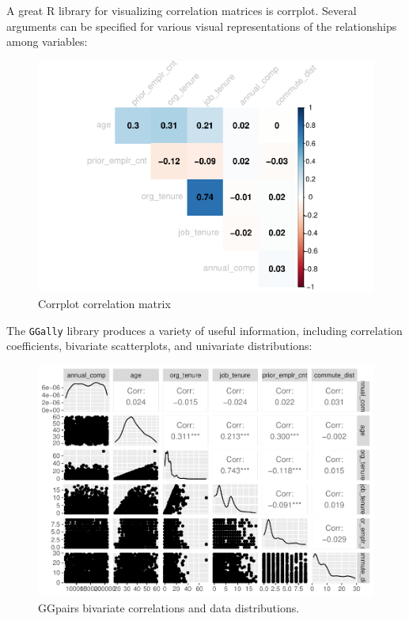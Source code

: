 \documentclass[
]{book}
\begin{document}
A great R library for visualizing correlation matrices is corrplot. Several arguments can be specified for various visual representations of the relationships among variables:

\begin{figure}

{\centering \includegraphics[width=1\linewidth]{The_Fundamentals_of_People_Analytics_files/figure-latex/corrplot-comp-1} 

}

\caption{Corrplot correlation matrix}\label{fig:corrplot-comp}
\end{figure}

The \texttt{GGally} library produces a variety of useful information, including correlation coefficients, bivariate scatterplots, and univariate distributions:

\begin{figure}

{\centering \includegraphics[width=1\linewidth]{The_Fundamentals_of_People_Analytics_files/figure-latex/ggpairs-comp-1} 

}

\caption{GGpairs bivariate correlations and data distributions.}\label{fig:ggpairs-comp}
\end{figure}
\end{document}
